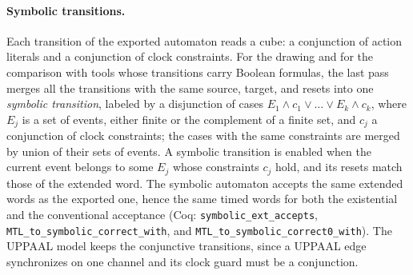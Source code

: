 \paragraph{Symbolic transitions.}
Each transition of the exported automaton reads a cube: a conjunction of
action literals and a conjunction of clock constraints.  For the drawing and
for the comparison with tools whose transitions carry Boolean formulas, the
last pass merges all the transitions with the same source, target, and
resets into one \emph{symbolic transition}, labeled by a disjunction of cases
$E_1\wedge c_1\vee\dots\vee E_k\wedge c_k$, where $E_j$ is a set of events,
either finite or the complement of a finite set, and $c_j$ a conjunction of
clock constraints; the cases with the same constraints are merged by union of
their sets of events.  A symbolic transition is enabled when the current
event belongs to some $E_j$ whose constraints $c_j$ hold, and its resets match
those of the extended word.  The symbolic automaton accepts the same extended
words as the exported one, hence the same timed words for both the
existential and the conventional acceptance (Coq:
\texttt{symbolic\_\allowbreak{}ext\_\allowbreak{}accepts},
\texttt{MTL\_\allowbreak{}to\_\allowbreak{}symbolic\_\allowbreak{}correct\_\allowbreak{}with}, and
\texttt{MTL\_\allowbreak{}to\_\allowbreak{}symbolic\_\allowbreak{}correct0\_\allowbreak{}with}).
The UPPAAL model keeps the conjunctive transitions, since a UPPAAL edge
synchronizes on one channel and its clock guard must be a conjunction.


